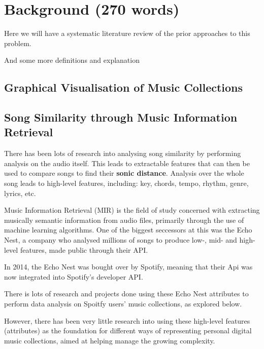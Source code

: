 \chapter{Background (270 words)}
Here we will have a systematic literature review of the prior
approaches to this problem.

And some more definitions and explanation

\section{Graphical Visualisation of Music Collections}



\section{Song Similarity through Music Information Retrieval}
There has been lots of research into analysing song similarity by performing analysis on the audio itself. This leads to extractable features that can then be used to compare songs to find their \textbf{sonic distance}.
Analysis over the whole song leads to high-level features, including: key, chords, tempo, rhythm, genre, lyrics, etc.

Music Information Retrieval (MIR) is the field of study concerned with extracting musically semantic information from audio files, primarily through the use of machine learning algorithms. One of the biggest seccessors at this was the Echo Nest, a company who analysed millions of songs to produce low-, mid- and high-level features, made public through their API.

In 2014, the Echo Nest was bought over by Spotify, meaning that their Api was now integrated into Spotify's developer API.

There is lots of research and projects done using these Echo Nest attributes to perform data analysis on Spoitfy users' music collections, as explored below.

However, there has been very little research into using these high-level features (attributes) as the foundation for different ways of representing personal digital music collections, aimed at helping manage the growing complexity.


